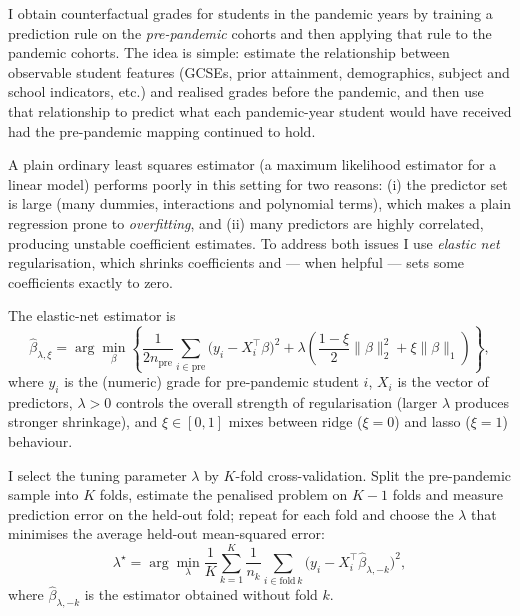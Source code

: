 I obtain counterfactual grades for students in the pandemic years by training a prediction rule on the \emph{pre-pandemic} cohorts and then applying that rule to the pandemic cohorts. The idea is simple: estimate the relationship between observable student features (GCSEs, prior attainment, demographics, subject and school indicators, etc.) and realised grades before the pandemic, and then use that relationship to predict what each pandemic-year student would have received had the pre-pandemic mapping continued to hold.

A plain ordinary least squares estimator (a maximum likelihood estimator for a linear model) performs poorly in this setting for two reasons: (i) the predictor set is large (many dummies, interactions and polynomial terms), which makes a plain regression prone to \emph{overfitting}, and (ii) many predictors are highly correlated, producing unstable coefficient estimates. To address both issues I use \emph{elastic net} regularisation, which shrinks coefficients and — when helpful — sets some coefficients exactly to zero.

The elastic-net estimator is
\begin{equation}\label{eq:elasticnet}
    \hat\beta_{\lambda,\xi}
    =
    \arg\min_{\beta}
    \left\{
        \frac{1}{2n_{\mathrm{pre}}}\sum_{i\in\mathrm{pre}}\big(y_i - X_i^{\top}\beta\big)^2
        +
        \lambda\left(
            \frac{1-\xi}{2}\|\beta\|_2^2
            +
            \xi\|\beta\|_1
        \right)
    \right\},
\end{equation}
where $y_i$ is the (numeric) grade for pre-pandemic student $i$, $X_i$ is the vector of predictors, $\lambda>0$ controls the overall strength of regularisation (larger $\lambda$ produces stronger shrinkage), and $\xi\in[0,1]$ mixes between ridge ($\xi=0$) and lasso ($\xi=1$) behaviour.

I select the tuning parameter $\lambda$ by $K$-fold cross-validation. Split the pre-pandemic sample into $K$ folds, estimate the penalised problem on $K-1$ folds and measure prediction error on the held-out fold; repeat for each fold and choose the $\lambda$ that minimises the average held-out mean-squared error:
\begin{equation}\label{eq:cv}
    \lambda^{\star}
    =
    \arg\min_{\lambda}
    \frac{1}{K}\sum_{k=1}^K \frac{1}{n_k}\sum_{i\in\mathrm{fold}\,k} \big(y_i - X_i^{\top}\hat\beta_{\lambda,-k}\big)^2,
\end{equation}
where $\hat\beta_{\lambda,-k}$ is the estimator obtained without fold $k$.

